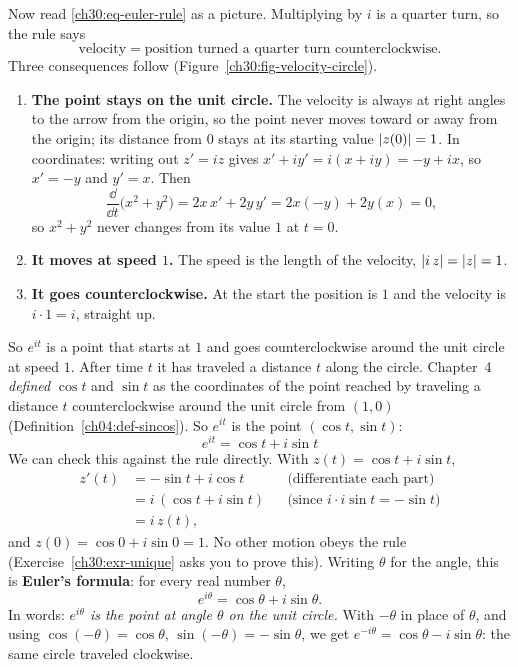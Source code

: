 Now read \eqref{ch30:eq-euler-rule} as a picture. Multiplying by $i$ is a quarter turn, so the rule says
\[
  \text{velocity} = \text{position turned a quarter turn counterclockwise}.
\]
Three consequences follow (Figure~\ref{ch30:fig-velocity-circle}).
\begin{enumerate}
  \item \textbf{The point stays on the unit circle.} The velocity is always at right angles to the arrow from the origin, so the point never moves toward or away from the origin; its distance from $0$ stays at its starting value $\lvert z(0)\rvert = 1$. In coordinates: writing out $z' = iz$ gives $x' + iy' = i(x+iy) = -y + ix$, so $x' = -y$ and $y' = x$. Then
  \[
    \frac{\dd}{\dd t}\bigl(x^2 + y^2\bigr) = 2x\,x' + 2y\,y' = 2x(-y) + 2y(x) = 0,
  \]
  so $x^2 + y^2$ never changes from its value $1$ at $t=0$.
  \item \textbf{It moves at speed $1$.} The speed is the length of the velocity, $\lvert i\,z\rvert = \lvert z\rvert = 1$.
  \item \textbf{It goes counterclockwise.} At the start the position is $1$ and the velocity is $i\cdot 1 = i$, straight up.
\end{enumerate}
So $e^{it}$ is a point that starts at $1$ and goes counterclockwise around the unit circle at speed $1$. After time $t$ it has traveled a distance $t$ along the circle. Chapter~4 \emph{defined} $\cos t$ and $\sin t$ as the coordinates of the point reached by traveling a distance $t$ counterclockwise around the unit circle from $(1,0)$ (Definition~\ref{ch04:def-sincos}). So $e^{it}$ is the point $(\cos t, \sin t)$:
\[
  \boxed{\,e^{it} = \cos t + i\sin t\,}
\]
We can check this against the rule directly. With $z(t) = \cos t + i \sin t$,
\begin{align*}
  z'(t) &= -\sin t + i\cos t && \text{(differentiate each part)}\\
        &= i\,(\cos t + i\sin t) && \text{(since $i \cdot i\sin t = -\sin t$)}\\
        &= i\,z(t),
\end{align*}
and $z(0) = \cos 0 + i\sin 0 = 1$. No other motion obeys the rule (Exercise~\ref{ch30:exr-unique} asks you to prove this). Writing $\theta$ for the angle, this is \textbf{Euler's formula}: for every real number $\theta$,
\[
  e^{i\theta} = \cos\theta + i\sin\theta .
\]
In words: \emph{$e^{i\theta}$ is the point at angle $\theta$ on the unit circle.} With $-\theta$ in place of $\theta$, and using $\cos(-\theta) = \cos\theta$, $\sin(-\theta) = -\sin\theta$, we get $e^{-i\theta} = \cos\theta - i\sin\theta$: the same circle traveled clockwise.

